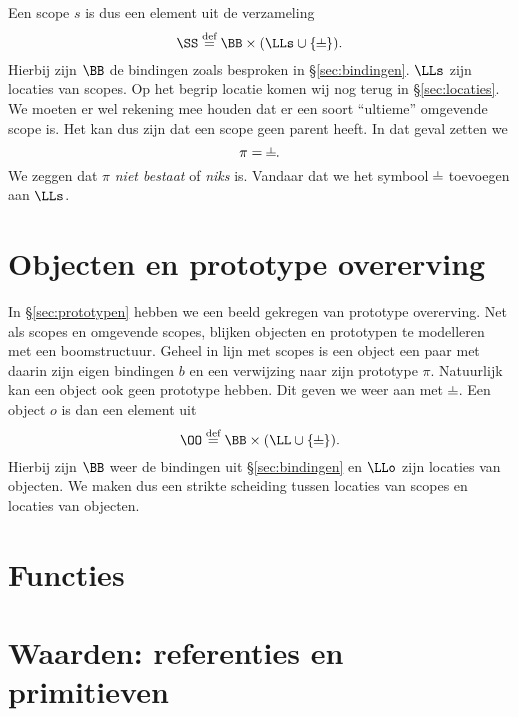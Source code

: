 Een scope $s$ is dus een element uit de verzameling
\begin{equation*}
  \SS \DEF \BB \times (\LLs \cup \{\nil\}).
\end{equation*}
Hierbij zijn $\BB$ de bindingen zoals besproken in §\ref{sec:bindingen}. $\LLs$ zijn locaties van scopes. Op het begrip locatie komen wij nog terug in §\ref{sec:locaties}. We moeten er wel rekening mee houden dat er een soort ``ultieme'' omgevende scope is. Het kan dus zijn dat een scope geen parent heeft. In dat geval zetten we
\begin{equation*}
  \pi = \nil.
\end{equation*}
We zeggen dat $\pi$ \emph{niet bestaat} of \emph{niks} is. Vandaar dat we het symbool $\nil$ toevoegen aan $\LLs$.

\section{Objecten en prototype overerving}

In §\ref{sec:prototypen} hebben we een beeld gekregen van prototype overerving. Net als scopes en omgevende scopes, blijken objecten en prototypen te modelleren met een boomstructuur. Geheel in lijn met scopes is een object een paar met daarin zijn eigen bindingen $b$ en een verwijzing naar zijn prototype $\pi$. Natuurlijk kan een object ook geen prototype hebben. Dit geven we weer aan met $\nil$. Een object $o$ is dan een element uit
\begin{equation*}
  \OO \DEF \BB \times (\LL \cup \{\nil\}).
\end{equation*}
Hierbij zijn $\BB$ weer de bindingen uit §\ref{sec:bindingen} en $\LLo$ zijn locaties van objecten. We maken dus een strikte scheiding tussen locaties van scopes en locaties van objecten.

\section{Functies}

\section{Waarden: referenties en primitieven}
\label{sec:waarden}

